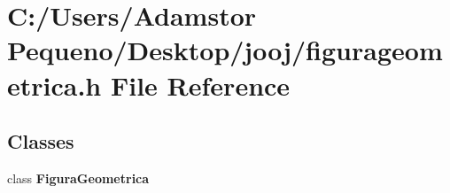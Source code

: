 \section{C\+:/\+Users/\+Adamstor Pequeno/\+Desktop/jooj/figurageometrica.h File Reference}
\label{figurageometrica_8h}
\subsection*{Classes}
\begin{DoxyCompactItemize}
\item 
class \textbf{ Figura\+Geometrica}
\end{DoxyCompactItemize}
